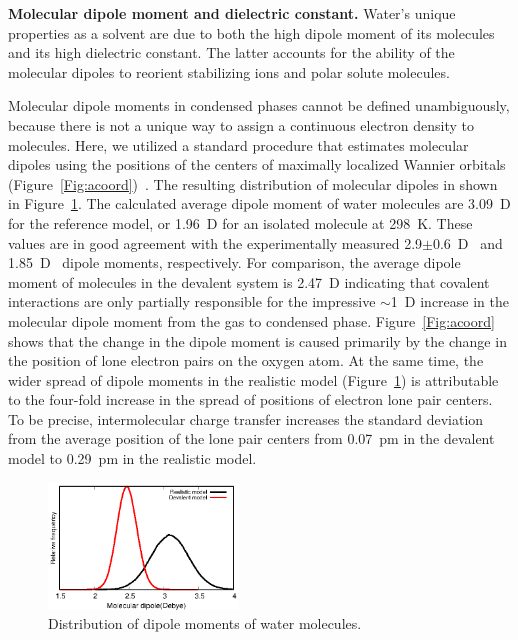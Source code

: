 \documentclass[journal=jacsat,manuscript=article]{achemso}
\begin{document}
\textbf{Molecular dipole moment and dielectric constant.} Water's unique properties as a solvent are due to both the high dipole moment of its molecules and its high dielectric constant. 
The latter accounts for the ability of the molecular dipoles to reorient stabilizing ions and polar solute molecules. 

Molecular dipole moments in condensed phases cannot be defined unambiguously, because there is not a unique way to assign a continuous electron density to molecules.
Here, we utilized a standard procedure that estimates molecular dipoles using the positions of the centers of maximally localized Wannier orbitals (Figure~\ref{Fig:acoord})~\cite{marzari1997maximally,sharma2007dipolar}. 
The resulting distribution of molecular dipoles in shown in Figure~\ref{Fig:dipoledist}.  
The calculated average dipole moment of water molecules are 3.09~D for the reference model, or 1.96~D for an isolated molecule at 298~K.
These values are in good agreement with the experimentally measured 2.9$\pm$0.6~D~\cite{badyal2000electron} and 1.85~D~\cite{haynes2014crc} dipole moments, respectively. 
For comparison, the average dipole moment of molecules in the devalent system is 2.47~D indicating that covalent interactions are only partially responsible for the impressive $\sim$1~D increase in the molecular dipole moment from the gas to condensed phase. 
Figure~\ref{Fig:acoord} shows that the change in the dipole moment is caused primarily by the change in the position of lone electron pairs on the oxygen atom. 
At the same time, the wider spread of dipole moments in the realistic model (Figure~\ref{Fig:dipoledist}) is attributable to the four-fold increase in the spread of positions of electron lone pair centers. 
To be precise, intermolecular charge transfer increases the standard deviation from the average position of the lone pair centers from 0.07~pm in the devalent model to 0.29~pm in the realistic model.
%

\begin{figure}
\includegraphics[width=0.45\textwidth]{new_dipole}
\caption{Distribution of dipole moments of water molecules.} \label{Fig:dipoledist}
\end{figure}
\end{document}
